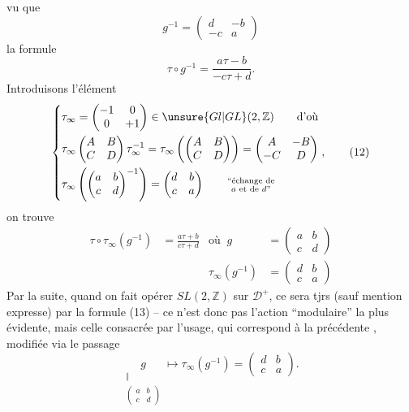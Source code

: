 vu que
\[
g^{-1}=\begin{pmatrix}d&-b\\-c&a\end{pmatrix}
\]
la formule
\[
\tau\circ g^{-1}=\frac{a\tau-b}{-c\tau+d}. \tag*{(11)}
\]
Introduisons l'élément
\[
\left\{\begin{aligned}
&\tau_\infty=\begin{pmatrix}-1&0\\0&+1\end{pmatrix}\in\unsure{Gl|GL}(2,\mathbb Z)\qquad\text{d'où}\\
&\tau_\infty\begin{pmatrix}A&B\\C&D\end{pmatrix}\tau_\infty^{-1}
=\tau_\infty\left(\begin{pmatrix}A&B\\C&D\end{pmatrix}\right)
=\begin{pmatrix}A&-B\\-C&D\end{pmatrix}\\
&\tau_\infty\left(\begin{pmatrix}a&b\\c&d\end{pmatrix}^{-1}\right)
=\begin{pmatrix}d&b\\c&a\end{pmatrix}\qquad\substack{\text{``échange de}\\\text{$a$ et de $d$''}}
\end{aligned}\right.,\tag*{(12)}
\]
on trouve
\[
\begin{aligned}
\tau\circ\tau_\infty(g^{-1})&=\frac{a\tau+b}{c\tau+d}
&\text{où }\ g&=\begin{pmatrix}a&b\\c&d\end{pmatrix}\\
&&\tau_\infty(g^{-1})&=\begin{pmatrix}d&b\\c&a\end{pmatrix}
\end{aligned}\tag*{(13)}
\]
Par la suite, quand on fait opérer $SL(2,\mathbb Z)$ sur $\mathcal D^+$, ce sera tjrs (sauf mention expresse) par la formule (13) -- ce n'est donc pas l'action ``modulaire'' la plus évidente, mais celle consacrée par l'usage, qui correspond à la précédente , modifiée via le passage
\[
\underset{\substack{\Vert\\\left(\begin{smallmatrix}a&b\\c&d\end{smallmatrix}\right)}}g\longmapsto\tau_\infty(g^{-1})=\begin{pmatrix}d&b\\c&a\end{pmatrix}.
\]

